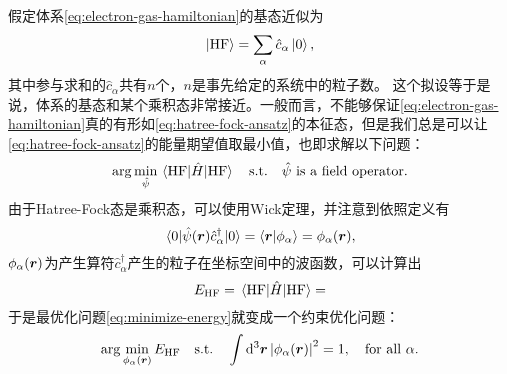 \documentclass[hyperref, UTF8, a4paper]{ctexart}
\newcommand*{\suchthat}{\quad \text{s.t.} \quad}
\newcommand*{\argmin}{\arg\min}
\begin{document}
假定体系\eqref{eq:electron-gas-hamiltonian}的基态近似为
\begin{equation}
    \ket{\text{HF}} = \sum_\alpha \hat{c}_\alpha \ket{0},
    \label{eq:hatree-fock-ansatz}
\end{equation}
其中参与求和的$\hat{c}_\alpha$共有$n$个，$n$是事先给定的系统中的粒子数。
这个拟设等于是说，体系的基态和某个乘积态非常接近。一般而言，不能够保证\eqref{eq:electron-gas-hamiltonian}真的有形如\eqref{eq:hatree-fock-ansatz}的本征态，但是我们总是可以让\eqref{eq:hatree-fock-ansatz}的能量期望值取最小值，也即求解以下问题：
\begin{equation}
    \argmin_{\hat{\psi}} \mel{\text{HF}}{\hat{H}}{\text{HF}} \suchthat \text{$\hat{\psi}$ is a field operator}.
    \label{eq:minimize-energy}
\end{equation}
由于Hatree-Fock态是乘积态，可以使用Wick定理，并注意到依照定义有
\[
    \mel{0}{\hat{\psi}(\vb*{r})\hat{c}^\dagger_\alpha}{0} = \braket{\vb*{r}}{\phi_\alpha} = \phi_\alpha(\vb*{r}),
\]
$\phi_\alpha(\vb*{r})$为产生算符$\hat{c}^\dagger_\alpha$产生的粒子在坐标空间中的波函数，可以计算出
\[
    E_\text{HF} = \mel{\text{HF}}{\hat{H}}{\text{HF}} = 
\]
于是最优化问题\eqref{eq:minimize-energy}就变成一个约束优化问题：
\[
    \argmin_{\phi_\alpha(\vb*{r})} E_\text{HF} \suchthat \int \dd[3]{\vb*{r}} \abs{\phi_\alpha(\vb*{r})}^2 = 1, \quad \text{for all $\alpha$}.
\]
\end{document}
